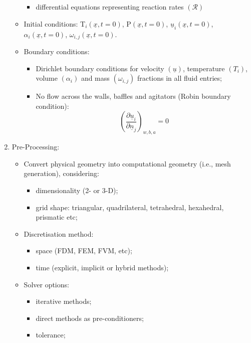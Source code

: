 \documentclass[12pts,a4paper,amsmath,amssymb,floatfix]{article}%
\newcounter{reaction}
\newcommand{\frc}{\displaystyle\frac}
\begin{document}
\begin{enumerate}
\begin{itemize}
\begin{itemize}
\item differential equations representing reaction rates $\left(\mathcal{R}\right)$
\end{itemize}
\item  Initial conditions: T$_{i}\left(\underline{x},t=0\right)$, P$\left(\underline{x},t=0\right)$, $\underline{u}_{i}\left(\underline{x},t=0\right)$, $\alpha_{i}\left(\underline{x},t=0\right)$, $\omega_{i,j}\left(\underline{x},t=0\right)$.  
\item Boundary conditions:
\begin{itemize}
\item Dirichlet boundary conditions for velocity $\left(\underline{u}\right)$, temperature $\left(T_{i}\right)$, volume $\left(\alpha_{i}\right)$ and mass $\left(\omega_{i,j}\right)$ fractions in all fluid entries;
\item No flow across the walls, baffles and agitators (Robin boundary condition):
\begin{displaymath}
\left(\frc{\partial \underline{u}_{i}}{\partial \underline{n}_{j}}\right)_{w,b,a}=0
\end{displaymath}
\end{itemize}
\end{itemize}
%
\item Pre-Processing:
\begin{itemize}
\item Convert physical geometry into computational geometry (i.e., mesh generation), considering:
\begin{itemize}
\item dimensionality (2- or 3-D);
\item grid shape: triangular, quadrilateral, tetrahedral, hexahedral, prismatic etc;
\end{itemize} 
\item Discretisation method:
\begin{itemize}
\item space (FDM, FEM, FVM, etc);
\item time (explicit, implicit or hybrid methods);
\end{itemize}
\item Solver options:
\begin{itemize}
\item iterative methods;
\item direct methods as pre-conditioners;
\item tolerance;
\end{itemize}
\end{itemize}
%
\end{enumerate}
\end{document}
